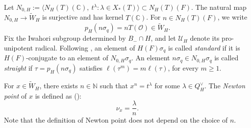 \documentclass[11pt]{amsart}
\numberwithin{equation}{section}
\theoremstyle{definition}
\theoremstyle{remark}
\begin{document}
Let
$
  N_{0,H}:=\bigl\langle N_H(T)(\mathbb{C}),\ t^\lambda:
  \lambda\in X_*(T)\bigr\rangle\subset N_H(T)(F).
$
The natural map $N_{0,H}\to\widetilde W_H$ is surjective and has kernel
$T(\mathbb{C})$. For $n\in N_H(T)(F)$, we write
\[
  p_H(n\sigma_q)=nT(\mathcal{O})\in\widetilde W_H.
\]
Fix the Iwahori subgroup determined by $B_-\cap H$, and
let $\mathcal{U}_H$ denote its pro-unipotent radical. Following \cite{NZ}, an element
of $H(F)\sigma_q$ is called \emph{standard} if it is
$H(F)$-conjugate to an element of $N_{0,H}\sigma_q$. An element
$n\sigma_q\in N_{0,H}\sigma_q$ is called \emph{straight}
if $\tau=p_H(n\sigma_q)$ satisfies
$\ell(\tau^m)=m\ell(\tau)$, for every $m\geq1$.

For $x\in\widetilde W_H$, there exists $n\in\mathbb{N}$ such that $x^{n}=t^\lambda$ for some $\lambda\in Q_H^{\vee}$. The \emph{Newton
point} of $x$ is defined as (\cite[Section~2]{HN}):
\[
\nu_x=\frac{\lambda}{n}.
\]
Note that the definition of Newton point does not depend on the choice of $n$.
\end{document}
